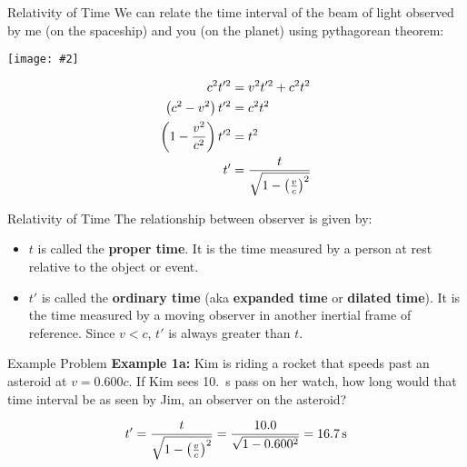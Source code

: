 \documentclass[12pt,compress,aspectratio=169]{beamer}
\newcommand{\pic}[2]{\texttt{[image: \#2]}}
\newcommand{\bigsqrt}{\ensuremath\sqrt{1-\left(\frac{v}{c}\right)^2}}
\newcommand{\eq}[2]{\vspace{#1}{\Large\begin{displaymath}#2\end{displaymath}}}
\begin{document}
\begin{frame}{Relativity of Time}
  We can relate the time interval of the beam of light observed by me (on the
  spaceship) and you (on the planet) using pythagorean theorem:
  \begin{center}
    \pic{.6}{graphics/dilation.png}
  \end{center}
  \begin{align*}
    c^2t'^2 &=v^2t'^2 + c^2t^2\\
    \left(c^2-v^2\right)t'^2 &=c^2t^2\\
    \left(1-\frac{v^2}{c^2}\right)t'^2 &=t^2\\
    t' &=\frac{t}{\bigsqrt}
  \end{align*}
\end{frame}


\begin{frame}{Relativity of Time}
  The relationship between observer is given by:
  
  \eq{-.2in}{
    \boxed{t' =\frac{t}{\bigsqrt}}
  }
  \begin{itemize}
  \item $t$ is called the \textbf{proper time}. It is the time measured
    by a person at rest relative to the object or event.
  \item $t'$ is called the \textbf{ordinary time} (aka \textbf{expanded time}
    or \textbf{dilated time}). It is the time measured by a moving observer in
    another inertial frame of reference. Since $v<c$, $t'$ is always greater
    than $t$.
  \end{itemize}
\end{frame}



\begin{frame}{Example Problem}
  \textbf{Example 1a:} Kim is riding a rocket that speeds past an asteroid at
  $v=0.600c$. If Kim sees \SI{10.}{\second} pass on her watch, how long would
  that time interval be as seen by Jim, an observer on the asteroid?

  \begin{displaymath}
    t' =\frac{t}{\bigsqrt}=\frac{10.0}{\sqrt{1-0.600^2}}=\SI{16.7}{\second}
  \end{displaymath}

\end{frame}
\end{document}
